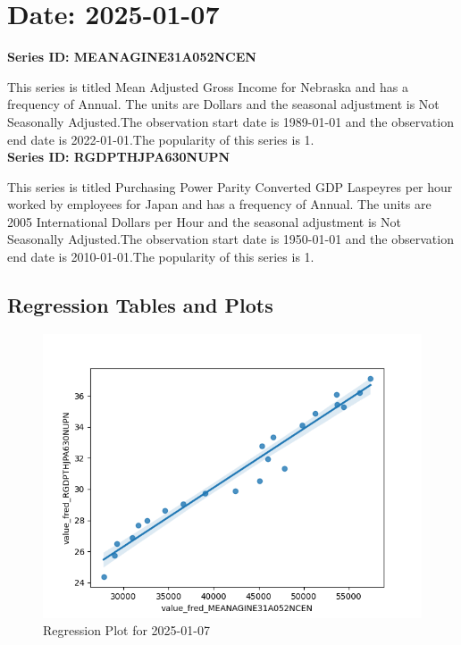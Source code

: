 \section{Date: 2025-01-07}
\noindent \textbf{Series ID: MEANAGINE31A052NCEN} 

\noindent This series is titled Mean Adjusted Gross Income for Nebraska and has a frequency of Annual. The units are Dollars and the seasonal adjustment is Not Seasonally Adjusted.The observation start date is 1989-01-01 and the observation end date is 2022-01-01.The popularity of this series is 1. \\ 

\noindent \textbf{Series ID: RGDPTHJPA630NUPN} 

\noindent This series is titled Purchasing Power Parity Converted GDP Laspeyres per hour worked by employees for Japan and has a frequency of Annual. The units are 2005 International Dollars per Hour and the seasonal adjustment is Not Seasonally Adjusted.The observation start date is 1950-01-01 and the observation end date is 2010-01-01.The popularity of this series is 1. \\ 

\subsection{Regression Tables and Plots}


\begin{figure}
\centering
\includegraphics[scale = 0.9]{plots/plot_2025-01-07.png}
\caption{Regression Plot for 2025-01-07}
\end{figure}
\newpage
